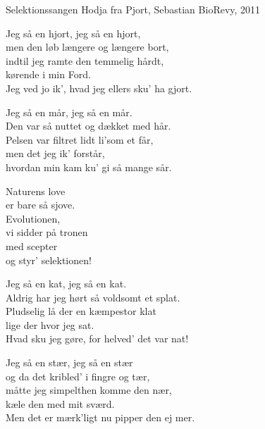 \begin{song}{Selektionssangen}
  {} %
  {Hodja fra Pjort, Sebastian} %
  {} %
  {BioRevy, 2011} %
  {\NotCCLIed} %

  \begin{SBVerse}
    Jeg så en hjort, jeg så en hjort,\\
    men den løb længere og længere bort,\\
    indtil jeg ramte den temmelig hårdt,\\
    kørende i min Ford.\\
    Jeg ved jo ik', hvad jeg ellers sku' ha gjort.
  \end{SBVerse}

  \begin{SBVerse}
    Jeg så en mår, jeg så en mår.\\
    Den var så nuttet og dækket med hår.\\
    Pelsen var filtret lidt li'som et får,\\
    men det jeg ik' forstår,\\
    hvordan min kam ku' gi så mange sår.
  \end{SBVerse}

  \begin{SBChorus}
    Naturens love\\
    er bare så sjove.\\
    Evolutionen,\\
    vi sidder på tronen\\
    med scepter\\
    og styr' selektionen!
  \end{SBChorus}

  \begin{SBVerse}
    Jeg så en kat, jeg så en kat.\\
    Aldrig har jeg hørt så voldsomt et splat.\\
    Pludselig lå der en kæmpestor klat\\
    lige der hvor jeg sat.\\
    Hvad sku jeg gøre, for helved' det var nat!
  \end{SBVerse}

  \begin{SBVerse}
    Jeg så en stær, jeg så en stær\\
    og da det kribled' i fingre og tær,\\
    måtte jeg simpelthen komme den nær,\\
    kæle den med mit sværd.\\
    Men det er mærk'ligt nu pipper den ej mer.
  \end{SBVerse}


\end{song}
